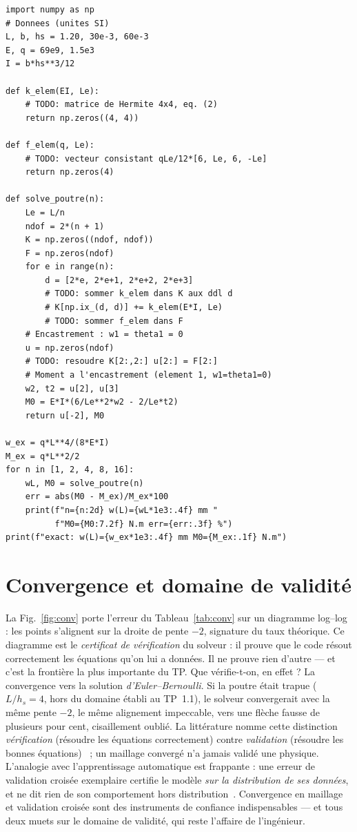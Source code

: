 \documentclass[10pt,journal]{IEEEtran}
\begin{document}
\begin{lstlisting}[caption={Squelette du solveur poutre de Hermite et de l'étude de convergence. Completer les TODO puis comparer au Tableau~\ref{tab:conv}.},label={lst:py},float=!t]
import numpy as np
# Donnees (unites SI)
L, b, hs = 1.20, 30e-3, 60e-3
E, q = 69e9, 1.5e3
I = b*hs**3/12

def k_elem(EI, Le):
    # TODO: matrice de Hermite 4x4, eq. (2)
    return np.zeros((4, 4))

def f_elem(q, Le):
    # TODO: vecteur consistant qLe/12*[6, Le, 6, -Le]
    return np.zeros(4)

def solve_poutre(n):
    Le = L/n
    ndof = 2*(n + 1)
    K = np.zeros((ndof, ndof))
    F = np.zeros(ndof)
    for e in range(n):
        d = [2*e, 2*e+1, 2*e+2, 2*e+3]
        # TODO: sommer k_elem dans K aux ddl d
        # K[np.ix_(d, d)] += k_elem(E*I, Le)
        # TODO: sommer f_elem dans F
    # Encastrement : w1 = theta1 = 0
    u = np.zeros(ndof)
    # TODO: resoudre K[2:,2:] u[2:] = F[2:]
    # Moment a l'encastrement (element 1, w1=theta1=0)
    w2, t2 = u[2], u[3]
    M0 = E*I*(6/Le**2*w2 - 2/Le*t2)
    return u[-2], M0

w_ex = q*L**4/(8*E*I)
M_ex = q*L**2/2
for n in [1, 2, 4, 8, 16]:
    wL, M0 = solve_poutre(n)
    err = abs(M0 - M_ex)/M_ex*100
    print(f"n={n:2d} w(L)={wL*1e3:.4f} mm "
          f"M0={M0:7.2f} N.m err={err:.3f} %")
print(f"exact: w(L)={w_ex*1e3:.4f} mm M0={M_ex:.1f} N.m")
\end{lstlisting}

\section{Convergence et domaine de validité}
\label{sec:domaine}
La Fig.~\ref{fig:conv} porte l'erreur du Tableau~\ref{tab:conv} sur un diagramme log--log : les points s'alignent sur la droite de pente $-2$, signature du taux théorique. Ce diagramme est le \emph{certificat de vérification} du solveur : il prouve que le code résout correctement les équations qu'on lui a données. Il ne prouve rien d'autre --- et c'est la frontière la plus importante du TP. Que vérifie-t-on, en effet ? La convergence vers la solution \emph{d'Euler--Bernoulli}. Si la poutre était trapue ($L/h_s=4$, hors du domaine établi au TP~1.1), le solveur convergerait avec la même pente $-2$, le même alignement impeccable, vers une flèche fausse de plusieurs pour cent, cisaillement oublié. La littérature nomme cette distinction \emph{vérification} (résoudre les équations correctement) contre \emph{validation} (résoudre les bonnes équations)~\cite{oberkampf} ; un maillage convergé n'a jamais validé une physique. L'analogie avec l'apprentissage automatique est frappante : une erreur de validation croisée exemplaire certifie le modèle \emph{sur la distribution de ses données}, et ne dit rien de son comportement hors distribution~\cite{forrester}. Convergence en maillage et validation croisée sont des instruments de confiance indispensables --- et tous deux muets sur le domaine de validité, qui reste l'affaire de l'ingénieur.
\end{document}
